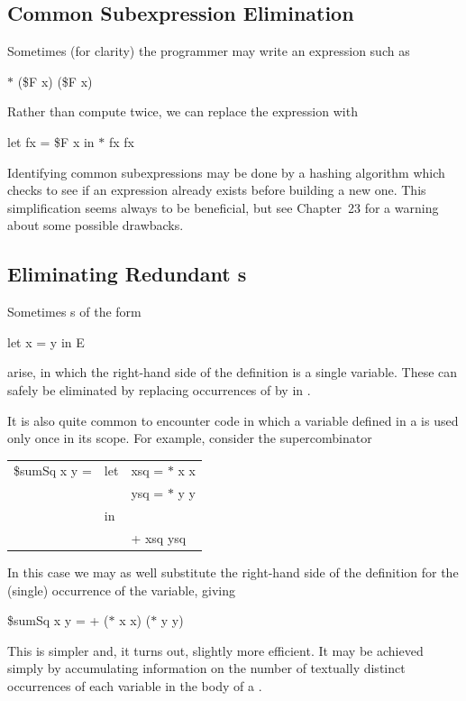 \subsection{Common Subexpression Elimination}

Sometimes (for clarity) the programmer may write an expression such as
\begin{mlcoded}
    $\ast$ (\$F x) (\$F x)
\end{mlcoded}
Rather than compute  twice, we can replace the expression with
\begin{mlcoded}
    let fx = \$F x in $\ast$ fx fx
\end{mlcoded}

Identifying common subexpressions may be done by a hashing algorithm
which checks to see if an expression already exists before building a new one.
This simplification seems always to be beneficial, but see Chapter~23 for a
warning about some possible drawbacks.

\subsection{Eliminating Redundant s}

Sometimes s of the form
\begin{mlcoded}
    let x = y in E
\end{mlcoded}
arise, in which the right-hand side of the definition is a single variable. These
can safely be eliminated by replacing occurrences of  by  in .

It is also quite common to encounter code in which a variable defined in a 
is used only once in its scope. For example, consider the supercombinator
\begin{mlcoded}
    \begin{tabular}{l@{ }l@{ }l}
        \$sumSq x y = &let & xsq  = $\ast$ x x \\
        & & ysq = $\ast$ y y \\
        & in & \\
        & &+ xsq ysq
    \end{tabular}
\end{mlcoded}
In this case we may as well substitute the right-hand side of the definition for
the (single) occurrence of the variable, giving
\begin{mlcoded}
    \$sumSq x y = + ($\ast$ x x) ($\ast$ y y)
\end{mlcoded}
This is simpler and, it turns out, slightly more efficient. It may be achieved
simply by accumulating information on the number of textually distinct
occurrences of each variable in the body of a .

